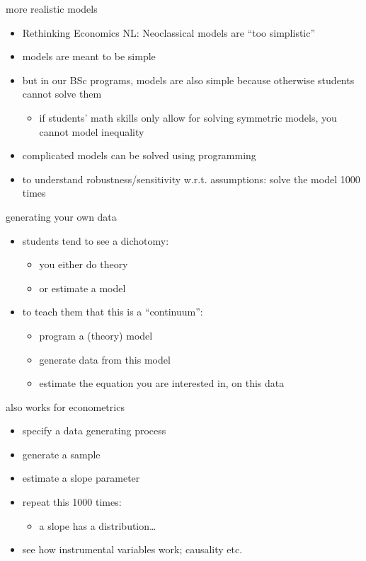 \documentclass[presentation]{beamer}
\begin{document}
\begin{frame}[label={sec:org60afc0e}]{more realistic models}
\begin{itemize}
\item Rethinking Economics NL: Neoclassical models are ``too simplistic''
\item models are meant to be simple
\item but in our BSc programs, models are also simple because otherwise students cannot solve them
\begin{itemize}
\item if students' math skills only allow for solving symmetric models, you cannot model inequality
\end{itemize}
\item complicated models can be solved using programming
\item to understand robustness/sensitivity w.r.t. assumptions: solve the model 1000 times
\end{itemize}
\end{frame}


\begin{frame}[label={sec:org72f2f30}]{generating your own data}
\begin{itemize}
\item students tend to see a dichotomy:
\begin{itemize}
\item you either do theory
\item or estimate a model
\end{itemize}
\item to teach them that this is a ``continuum'':
\begin{itemize}
\item program a (theory) model
\item generate data from this model
\item estimate the equation you are interested in, on this data
\end{itemize}
\end{itemize}
\end{frame}

\begin{frame}[label={sec:org0fc1bd5}]{also works for econometrics}
\begin{itemize}
\item specify a data generating process
\item generate a sample
\item estimate a slope parameter
\item repeat this 1000 times:
\begin{itemize}
\item a slope has a distribution\ldots{}
\end{itemize}
\item see how instrumental variables work; causality etc.
\end{itemize}
\end{frame}
\end{document}
